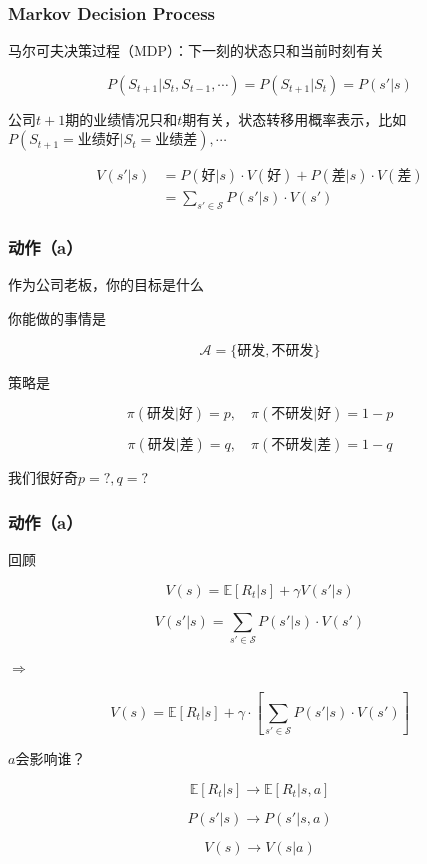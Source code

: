 \documentclass[8pt]{beamer}
\begin{document}

\begin{frame}
\frametitle{Markov Decision Process}

马尔可夫决策过程（MDP）：下一刻的状态只和当前时刻有关

\[
P(S_{t+1}|S_t,S_{t-1},\cdots)=P(S_{t+1}|S_t)=P(s'|s)
\]

\vspace{1em}

公司$t+1$期的业绩情况只和$t$期有关，状态转移用概率表示，比如 $P(S_{t+1}=\text{业绩好}|S_t=\text{业绩差}),\cdots$

\[
\begin{aligned}
V(s'|s)&=P(\text{好}|s)\cdot V(\text{好})+P(\text{差}|s)\cdot V(\text{差})\\
&=\sum_{s'\in \mathcal{S}}P(s'|s)\cdot V(s')
\end{aligned}
\]

\end{frame}


\begin{frame}
\frametitle{动作（a）}

作为公司老板，你的目标是什么\pause

\vspace{1em}

你能做的事情是

\[
\mathcal{A}=\{\text{研发}, \text{不研发}\}
\]

策略是

\[
\pi(\text{研发}|\text{好})=p,\quad \pi(\text{不研发}|\text{好})=1-p
\]

\[
\pi(\text{研发}|\text{差})=q,\quad \pi(\text{不研发}|\text{差})=1-q
\]

\vspace{1em}

我们很好奇$p=?,q=?$

\end{frame}


\begin{frame}
\frametitle{动作（a）}

回顾

\[
V(s)=\mathbb{E}[R_t|s]+\gamma V(s'|s)
\]

\[
V(s'|s)=\sum_{s'\in \mathcal{S}}P(s'|s)\cdot V(s')
\]

\pause

$\Rightarrow$

\[
V(s)=\mathbb{E}[R_t|s]+\gamma\cdot \left[\sum_{s'\in \mathcal{S}}P(s'|s)\cdot V(s')\right]
\]

$a$会影响谁？

\pause

\[
\mathbb{E}[R_t|s]\rightarrow \mathbb{E}[R_t|s,a]
\]

\[
P(s'|s)\rightarrow P(s'|s,a)
\]

\[
V(s)\rightarrow V(s|a)
\]


\end{frame}
\end{document}
